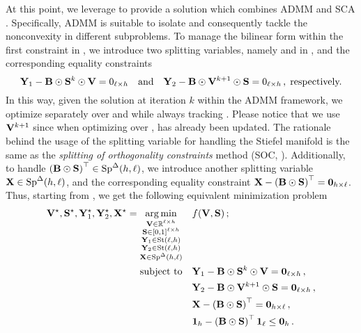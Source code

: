 At this point, we leverage  to provide a solution which combines ADMM  and SCA .
Specifically, ADMM is suitable to isolate and consequently tackle the nonconvexity in different subproblems.
To manage the bilinear form within the first constraint in , we introduce two splitting variables, namely \YO and \YT in , and the corresponding equality constraints
\begin{equation}\label{eq:splitting_constraints_partial}
    \mathbf{Y}_1 - \mathbf{B}\odot\mathbf{S}^k\odot \mathbf{V} = 0_{\ell \times h} \quad \text{and} \quad \mathbf{Y}_2 - \mathbf{B}\odot\mathbf{V}^{k+1}\odot\mathbf{S} = 0_{\ell \times h}\,, \; \text{respectively.}
\end{equation}
In this way, given the solution at iteration $k$ within the ADMM framework, we optimize separately over \V and \Supp while always tracking .
Please notice that we use $\mathbf{V}^{k+1}$ since when optimizing over \Supp, \V has already been updated.
The rationale behind the usage of the splitting variable for handling the Stiefel manifold is the same as the \emph{splitting of orthogonality constraints} method (SOC, ).
Additionally, to handle $\left(\mathbf{B} \odot \mathbf{S}\right)^\top \in \mathrm{Sp}^{\Delta}({h},{\ell})$, we introduce another splitting variable $\mathbf{X} \in \mathrm{Sp}^{\Delta}({h},{\ell})$, and the corresponding equality constraint $\mathbf{X} - \left(\mathbf{B} \odot \mathbf{S}\right)^\top=\boldsymbol{0}_{h\times \ell}$.
Thus, starting from , we get the following equivalent minimization problem
\begin{equation}\label{eq:prob_madmmsca_VS_with_splitting}
    \begin{aligned}
        \mathbf{V}^\star, \mathbf{S}^\star, \mathbf{Y}_1^\star, \mathbf{Y}_2^\star, \mathbf{X}^\star = \operatorname*{arg\,min}_{\substack{\mathbf{V} \in \mathbb{R}^{\ell \times h}\\ \mathbf{S} \in [0,1]^{\ell \times h} \\ \mathbf{Y}_1 \in \mathrm{St}({\ell},{h}) \\ \mathbf{Y}_2 \in \mathrm{St}({\ell},{h}) \\ \mathbf{X} \in \mathrm{Sp}^{\Delta}({h},{\ell})}} &\quad f(\mathbf{V},\mathbf{S})\,;\\
         \textrm{subject to} & \quad \mathbf{Y}_1 - \mathbf{B} \odot \mathbf{S}^k \odot \mathbf{V} = \boldsymbol{0}_{\ell \times h}\,, \\
         & \quad \mathbf{Y}_2 - \mathbf{B} \odot \mathbf{V}^{k+1} \odot \mathbf{S} = \boldsymbol{0}_{\ell \times h}\,, \\
         & \quad \mathbf{X} - \left(\mathbf{B} \odot \mathbf{S}\right)^\top = \boldsymbol{0}_{h \times \ell}\,, \\
         & \quad \boldsymbol{1}_h - \left(\mathbf{B} \odot \mathbf{S}\right)^\top \boldsymbol{1}_\ell \leq \boldsymbol{0}_h\,.
    \end{aligned}
\end{equation}

